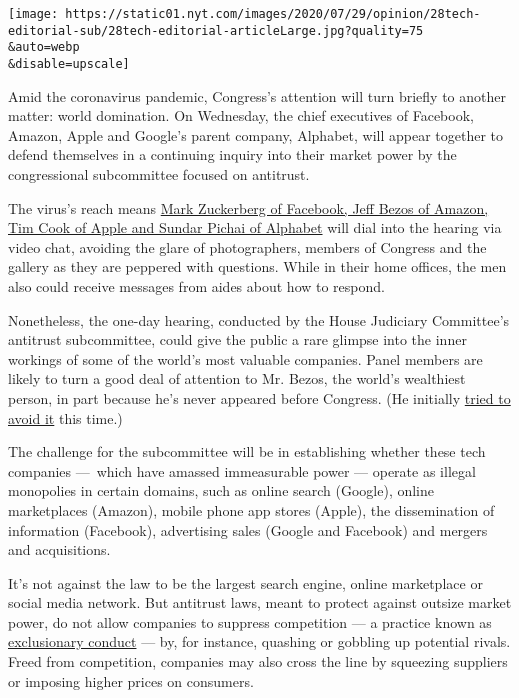 \texttt{[image: https://static01.nyt.com/images/2020/07/29/opinion/28tech-editorial-sub/28tech-editorial-articleLarge.jpg?quality=75\\\&auto=webp\\\&disable=upscale]}

Amid the coronavirus pandemic, Congress's attention will turn briefly to
another matter: world domination. On Wednesday, the chief executives of
Facebook, Amazon, Apple and Google's parent company, Alphabet, will
appear together to defend themselves in a continuing inquiry into their
market power by the congressional subcommittee focused on antitrust.

The virus's reach means
\href{https://www.nytimes.com/live/2020/07/29/technology/tech-ceos-hearing-testimony}{Mark
Zuckerberg of Facebook, Jeff Bezos of Amazon, Tim Cook of Apple and
Sundar Pichai of Alphabet} will dial into the hearing via video chat,
avoiding the glare of photographers, members of Congress and the gallery
as they are peppered with questions. While in their home offices, the
men also could receive messages from aides about how to respond.

Nonetheless, the one-day hearing, conducted by the House Judiciary
Committee's antitrust subcommittee, could give the public a rare glimpse
into the inner workings of some of the world's most valuable companies.
Panel members are likely to turn a good deal of attention to Mr. Bezos,
the world's wealthiest person, in part because he's never appeared
before Congress. (He initially
\href{https://www.nytimes.com/2020/05/15/technology/jeff-bezos-amazon-testimony-congress.html}{tried
to avoid it} this time.)

The challenge for the subcommittee will be in establishing whether these
tech companies ---~which have amassed immeasurable power --- operate as
illegal monopolies in certain domains, such as online search (Google),
online marketplaces (Amazon), mobile phone app stores (Apple), the
dissemination of information (Facebook), advertising sales (Google and
Facebook) and mergers and acquisitions.

It's not against the law to be the largest search engine, online
marketplace or social media network. But antitrust laws, meant to
protect against outsize market power, do not allow companies to suppress
competition --- a practice known as
\href{https://www.ftc.gov/tips-advice/competition-guidance/guide-antitrust-laws/single-firm-conduct/monopolization-defined}{exclusionary
conduct} --- by, for instance, quashing or gobbling up potential rivals.
Freed from competition, companies may also cross the line by squeezing
suppliers or imposing higher prices on consumers.


